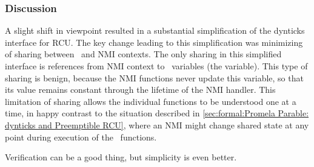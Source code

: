 \QuickQuizEnd

\subsubsection{Discussion}
\label{sec:formal:Discussion}

A slight shift in viewpoint resulted in a substantial simplification
of the dynticks interface for RCU.
The key change leading to this simplification was minimizing of
sharing between \IRQ\ and NMI contexts.
The only sharing in this simplified interface is references from NMI
context to \IRQ\ variables (the  variable).
This type of sharing is benign, because the NMI functions never update
this variable, so that its value remains constant through the lifetime
of the NMI handler.
This limitation of sharing allows the individual functions to be
understood one at a time, in happy contrast to the situation
described in
\cref{sec:formal:Promela Parable: dynticks and Preemptible RCU},
where an NMI might change shared state at any point during execution of
the \IRQ\ functions.

Verification can be a good thing, but simplicity is even better.


